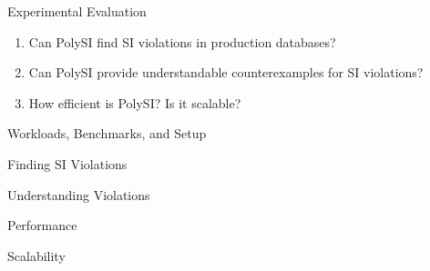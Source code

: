 
\begin{frame}{Experimental Evaluation}
	\begin{center}
		\begin{enumerate}[(1)]
			\setlength{\itemsep}{15pt}
			\item {}
			  Can PolySI find SI violations in production databases?
			\item {}
			  Can PolySI provide understandable counterexamples for SI violations?
			\item {}
			  How efficient is PolySI? Is it scalable?
		\end{enumerate}
	\end{center}
\end{frame}

\begin{frame}{Workloads, Benchmarks, and Setup}
\end{frame}

\begin{frame}{Finding SI Violations}
\end{frame}

\begin{frame}{Understanding Violations}
\end{frame}

\begin{frame}{Performance}
\end{frame}

\begin{frame}{Scalability}
\end{frame}

\begin{frame}{}
\end{frame}

\begin{frame}{}
\end{frame}

\begin{frame}{}
\end{frame}
